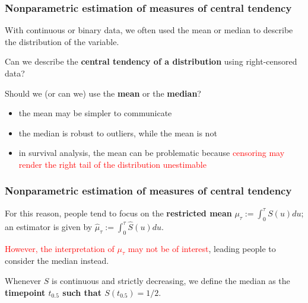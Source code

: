 \documentclass[12pt, 
hyperref={colorlinks=true, linkcolor=blue, urlcolor=cyan},dvipsnames]{beamer}
\begin{document}
\begin{frame}
\frametitle{Nonparametric estimation of measures of central tendency}

With continuous or binary data, we often used the mean or median to describe the distribution of the variable.

Can we describe the \textbf{central tendency of a distribution} using right-censored data?

Should we (or can we) use the \textbf{mean} or the \textbf{median}?
\begin{itemize}
\item the mean may be simpler to communicate
\item the median is robust to outliers, while the mean is not
\item in survival analysis, the mean can be problematic because \textcolor{red}{censoring may render the right tail of the distribution unestimable}
\end{itemize}
\end{frame}

\begin{frame}
\frametitle{Nonparametric estimation of measures of central tendency}

For this reason, people tend to focus on the \textbf{restricted mean} $\mu_\tau := \int_0^\tau S(u) du$; an estimator is given by $\widehat{\mu}_\tau := \int_0^\tau \widehat{S}(u)du$.

\textcolor{red}{However, the interpretation of $\mu_\tau$ may not be of interest}, leading people to consider the median instead.

Whenever $S$ is continuous and strictly decreasing, we define the median as the \textbf{timepoint $t_{0.5}$ such that $S(t_{0.5}) = 1/2$}.
\end{frame}
\end{document}
